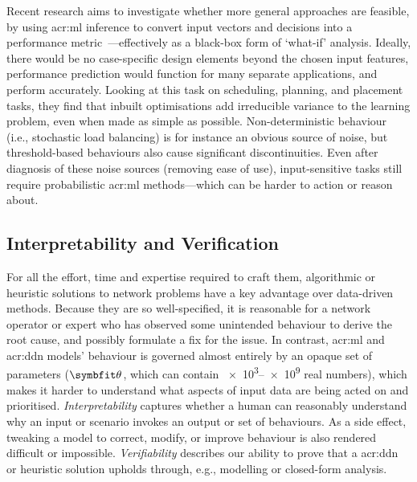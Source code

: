 Recent research aims to investigate whether more general approaches are feasible, by using \gls{acr:ml} inference to convert input vectors and decisions into a performance metric~\parencite{DBLP:conf/nsdi/FuGMR21}---effectively as a black-box form of `what-if' analysis.
Ideally, there would be no case-specific design elements beyond the chosen input features, performance prediction would function for many separate applications, and perform accurately.
Looking at this task on scheduling, planning, and placement tasks, they find that inbuilt optimisations add irreducible variance to the learning problem, even when made as simple as possible.
Non-deterministic behaviour (i.e., stochastic load balancing) is for instance an obvious source of noise, but threshold-based behaviours also cause significant discontinuities.
Even after diagnosis of these noise sources (removing ease of use), input-sensitive tasks still require probabilistic \gls{acr:ml} methods---which can be harder to action or reason about.

\subsection{Interpretability and Verification}
For all the effort, time and expertise required to craft them, algorithmic or heuristic solutions to network problems have a key advantage over data-driven methods.
Because they are so well-specified, it is reasonable for a network operator or expert who has observed some unintended behaviour to derive the root cause, and possibly formulate a fix for the issue.
In contrast, \gls{acr:ml} and \gls{acr:ddn} models' behaviour is governed almost entirely by an opaque set of parameters ($\wvec{}$, which can contain \numrange{e3}{e9} real numbers), which makes it harder to understand what aspects of input data are being acted on and prioritised.
\emph{Interpretability} captures whether a human can reasonably understand why an input or scenario invokes an output or set of behaviours.
As a side effect, tweaking a model to correct, modify, or improve behaviour is also rendered difficult or impossible.
\emph{Verifiability} describes our ability to prove that a \gls{acr:ddn} or heuristic solution upholds through, e.g., modelling or closed-form analysis.

